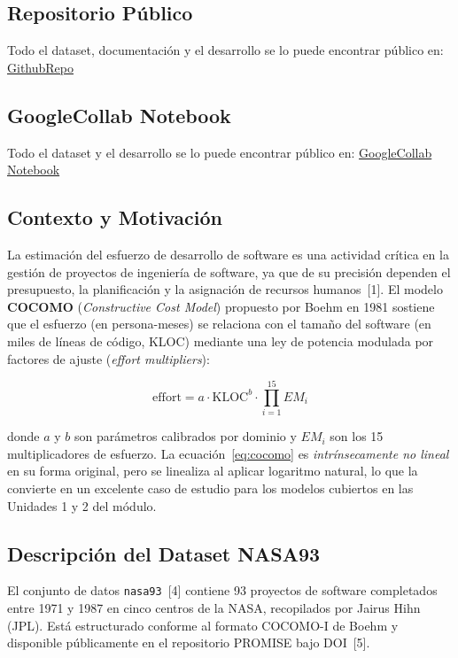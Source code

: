 \documentclass[11pt,a4paper]{article}
\begin{document}
\subsection{Repositorio Público}
Todo el dataset, documentación y el desarrollo se lo puede encontrar público en: 
\href{https://github.com/n3cr0murl0c/DataScience-Lab1}{GithubRepo}
\subsection{GoogleCollab Notebook}
Todo el dataset y el desarrollo se lo puede encontrar público en: 
\href{https://colab.research.google.com/drive/1fvhuDQhcNRDZzjQUUtAXuexb74Eo9zhw?usp=sharing}{GoogleCollab Notebook}
\subsection{Contexto y Motivación}

La estimación del esfuerzo de desarrollo de software es una actividad crítica en la gestión de proyectos de ingeniería de software, ya que de su precisión dependen el presupuesto, la planificación y la asignación de recursos humanos~[1]. El modelo \textbf{COCOMO} (\textit{Constructive Cost Model}) propuesto por Boehm en 1981 sostiene que el esfuerzo (en persona-meses) se relaciona con el tamaño del software (en miles de líneas de código, KLOC) mediante una ley de potencia modulada por factores de ajuste (\textit{effort multipliers}):

\begin{equation}
\mathrm{effort} = a \cdot \mathrm{KLOC}^{b} \cdot \prod_{i=1}^{15} EM_{i}
\label{eq:cocomo}
\end{equation}

donde $a$ y $b$ son parámetros calibrados por dominio y $EM_i$ son los 15 multiplicadores de esfuerzo. La ecuación~\ref{eq:cocomo} es \emph{intrínsecamente no lineal} en su forma original, pero se linealiza al aplicar logaritmo natural, lo que la convierte en un excelente caso de estudio para los modelos cubiertos en las Unidades 1 y 2 del módulo.

\subsection{Descripción del Dataset NASA93}

El conjunto de datos \texttt{nasa93}~[4] contiene 93 proyectos de software completados entre 1971 y 1987 en cinco centros de la NASA, recopilados por Jairus Hihn (JPL). Está estructurado conforme al formato COCOMO-I de Boehm y disponible públicamente en el repositorio PROMISE bajo DOI~[5].
\end{document}
